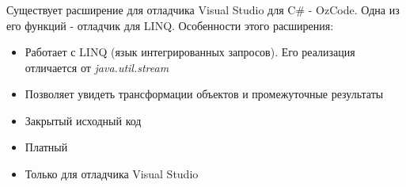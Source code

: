 \begin{frame}
\frametitle{\insertsection} 
\framesubtitle{\insertsubsection}
Существует расширение для отладчика Visual Studio для C\# - OzCode. Одна из его функций - отладчик для LINQ. Особенности этого расширения: 
\begin{itemize}
	\item Работает с LINQ (язык интегрированных запросов). Его реализация отличается от \textit{java.util.stream}
	\item Позволяет увидеть трансформации объектов и промежуточные результаты
	\item Закрытый исходный код
	\item Платный
	\item Только для отладчика Visual Studio
\end{itemize}
\end{frame}
